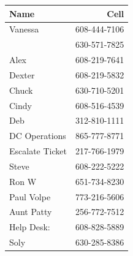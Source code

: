 \documentclass[12pt,twoside]{article}
\begin{document}
\begin{center}
\begin{tabular}{lr}
\hline
\textbf{Name} & \textbf{Cell}\\
\hline
Vanessa & 608-444-7106\\
 & 630-571-7825\\
Alex & 608-219-7641\\
Dexter & 608-219-5832\\
Chuck & 630-710-5201\\
Cindy & 608-516-4539\\
Deb & 312-810-1111\\
DC Operations & 865-777-8771\\
Escalate Ticket & 217-766-1979\\
Steve & 608-222-5222\\
Ron W & 651-734-8230\\
Paul Volpe & 773-216-5606\\
Aunt Patty & 256-772-7512\\
Help Desk: & 608-828-5889\\
Soly & 630-285-8386\\
\hline
\end{tabular}
\end{center}
\end{document}
